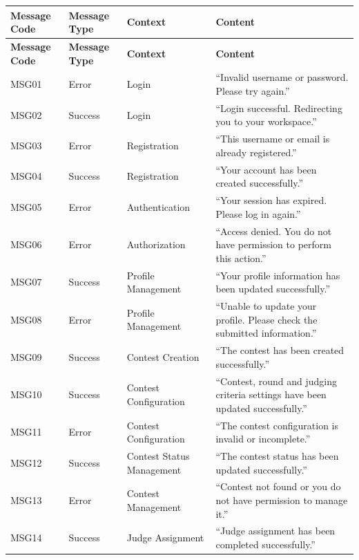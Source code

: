 \vspace{0.5em}
\renewcommand{\arraystretch}{1.15}
\setlength{\tabcolsep}{4pt}
\small
\begin{longtable}{|>{\centering\arraybackslash}p{}|>{\centering\arraybackslash}p{}|>{\raggedright\arraybackslash}p{}|>{\raggedright\arraybackslash}p{}|}
\hline
\textbf{Message Code} & \textbf{Message Type} & \textbf{Context} & \textbf{Content} \\
\hline
\endfirsthead
\textbf{Message Code} & \textbf{Message Type} & \textbf{Context} & \textbf{Content} \\
\hline
\endhead
MSG01 & Error & Login & ``Invalid username or password. Please try again.'' \\
\hline
MSG02 & Success & Login & ``Login successful. Redirecting you to your workspace.'' \\
\hline
MSG03 & Error & Registration & ``This username or email is already registered.'' \\
\hline
MSG04 & Success & Registration & ``Your account has been created successfully.'' \\
\hline
MSG05 & Error & Authentication & ``Your session has expired. Please log in again.'' \\
\hline
MSG06 & Error & Authorization & ``Access denied. You do not have permission to perform this action.'' \\
\hline
MSG07 & Success & Profile Management & ``Your profile information has been updated successfully.'' \\
\hline
MSG08 & Error & Profile Management & ``Unable to update your profile. Please check the submitted information.'' \\
\hline
MSG09 & Success & Contest Creation & ``The contest has been created successfully.'' \\
\hline
MSG10 & Success & Contest Configuration & ``Contest, round and judging criteria settings have been updated successfully.'' \\
\hline
MSG11 & Error & Contest Configuration & ``The contest configuration is invalid or incomplete.'' \\
\hline
MSG12 & Success & Contest Status Management & ``The contest status has been updated successfully.'' \\
\hline
MSG13 & Error & Contest Management & ``Contest not found or you do not have permission to manage it.'' \\
\hline
MSG14 & Success & Judge Assignment & ``Judge assignment has been completed successfully.'' \\

\end{longtable}
